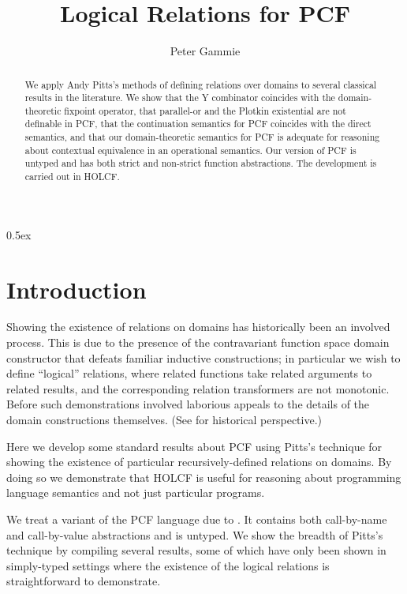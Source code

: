 \documentclass[11pt,a4paper]{article}
\begin{document}
\title{Logical Relations for PCF}
\author{Peter Gammie}
\maketitle

\begin{abstract}
  We apply Andy Pitts's methods of defining relations over domains to
  several classical results in the literature. We show that the Y
  combinator coincides with the domain-theoretic fixpoint operator,
  that parallel-or and the Plotkin existential are not definable in
  PCF, that the continuation semantics for PCF coincides with the
  direct semantics, and that our domain-theoretic semantics for PCF is
  adequate for reasoning about contextual equivalence in an
  operational semantics. Our version of PCF is untyped and has both
  strict and non-strict function abstractions. The development is
  carried out in HOLCF.
\end{abstract}

\tableofcontents

\parskip 0.5ex

\section{Introduction}

\label{sec:introduction}

Showing the existence of relations on domains has historically been an
involved process. This is due to the presence of the contravariant
function space domain constructor that defeats familiar inductive
constructions; in particular we wish to define ``logical'' relations,
where related functions take related arguments to related results, and
the corresponding relation transformers are not monotonic.  Before
\citet{PittsAM:relpod} such demonstrations involved laborious appeals
to the details of the domain constructions themselves. (See
\citet{Mulmuley:1987,Stoy:1977} for historical perspective.)

Here we develop some standard results about PCF using Pitts's
technique for showing the existence of particular recursively-defined
relations on domains. By doing so we demonstrate that HOLCF
\citep{HOLCF:1999,holcf11} is useful for reasoning about programming
language semantics and not just particular programs.

We treat a variant of the PCF language due to \citet{Plotkin77}. It
contains both call-by-name and call-by-value abstractions and is
untyped. We show the breadth of Pitts's technique by compiling several
results, some of which have only been shown in simply-typed settings
where the existence of the logical relations is straightforward to
demonstrate.
\end{document}
